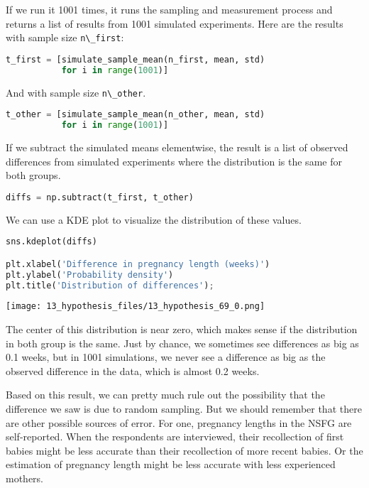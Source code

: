 If we run it 1001 times, it runs the sampling and measurement process
and returns a list of results from 1001 simulated experiments. Here are
the results with sample size \passthrough{\lstinline!n\_first!}:

\begin{lstlisting}[language=Python,style=source]
t_first = [simulate_sample_mean(n_first, mean, std)
           for i in range(1001)]
\end{lstlisting}

And with sample size \passthrough{\lstinline!n\_other!}.

\begin{lstlisting}[language=Python,style=source]
t_other = [simulate_sample_mean(n_other, mean, std)
           for i in range(1001)]
\end{lstlisting}

If we subtract the simulated means elementwise, the result is a list of
observed differences from simulated experiments where the distribution
is the same for both groups.

\begin{lstlisting}[language=Python,style=source]
diffs = np.subtract(t_first, t_other)
\end{lstlisting}

We can use a KDE plot to visualize the distribution of these values.

\begin{lstlisting}[language=Python,style=source]
sns.kdeplot(diffs)

plt.xlabel('Difference in pregnancy length (weeks)')
plt.ylabel('Probability density')
plt.title('Distribution of differences');
\end{lstlisting}

\begin{center}
\texttt{[image: 13\_hypothesis\_files/13\_hypothesis\_69\_0.png]}
\end{center}

The center of this distribution is near zero, which makes sense if the
distribution in both group is the same. Just by chance, we sometimes see
differences as big as 0.1 weeks, but in 1001 simulations, we never see a
difference as big as the observed difference in the data, which is
almost 0.2 weeks.

Based on this result, we can pretty much rule out the possibility that
the difference we saw is due to random sampling. But we should remember
that there are other possible sources of error. For one, pregnancy
lengths in the NSFG are self-reported. When the respondents are
interviewed, their recollection of first babies might be less accurate
than their recollection of more recent babies. Or the estimation of
pregnancy length might be less accurate with less experienced mothers.

